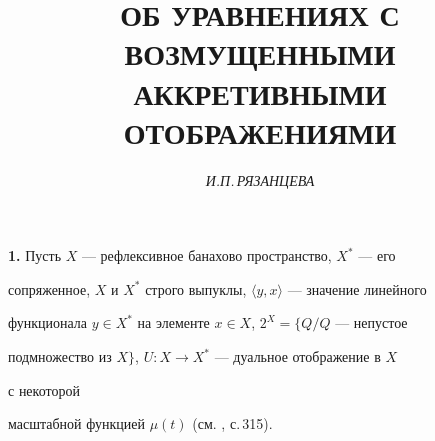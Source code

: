 

 




 


\newcommand{\la}{\langle} 


\newcommand{\ra}{\rangle} 


\newcommand{\rhu}{\rightharpoonup} 


\setcounter{page}{61} 








\author{\it И.П.\,РЯЗАНЦЕВА} 


\title{ОБ УРАВНЕНИЯХ С ВОЗМУЩЕННЫМИ АККРЕТИВНЫМИ ОТОБРАЖЕНИЯМИ} 


 




\date{} 


\pagestyle{plain} 


 


 


\maketitle 


 


 


{\bf 1.} Пусть $X$ --- рефлексивное банахово пространство, $X^*$ --- его 


сопряженное, $X$ и $X^*$ строго выпуклы, $\la y,x\ra$ --- значение линейного 


функционала $y\in X^*$ на элементе $x\in X$, $2^X=\{Q/Q$ --- непустое 


подмножество из $X\}$, $U:X\to X^*$ --- дуальное отображение в $X$ 


с некоторой 


масштабной функцией $\mu(t)$ (см. \cite{Vai}, с.\,315). 


